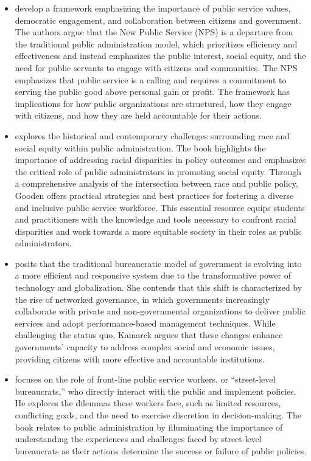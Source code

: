 \documentclass[12pt, letterpaper]{article}
\begin{document}
\begin{itemize}
    \item \cite{Denhardt2015} develop a framework emphasizing the importance of public service values, democratic engagement, and collaboration between citizens and government. The authors argue that the New Public Service (NPS) is a departure from the traditional public administration model, which prioritizes efficiency and effectiveness and instead emphasizes the public interest, social equity, and the need for public servants to engage with citizens and communities. The NPS emphasizes that public service is a calling and requires a commitment to serving the public good above personal gain or profit. The framework has implications for how public organizations are structured, how they engage with citizens, and how they are held accountable for their actions.
    \item \cite{Gooden2014} explores the historical and contemporary challenges surrounding race and social equity within public administration. The book highlights the importance of addressing racial disparities in policy outcomes and emphasizes the critical role of public administrators in promoting social equity. Through a comprehensive analysis of the intersection between race and public policy, Gooden offers practical strategies and best practices for fostering a diverse and inclusive public service workforce. This essential resource equips students and practitioners with the knowledge and tools necessary to confront racial disparities and work towards a more equitable society in their roles as public administrators.
    \item \cite{Kamarck2007} posits that the traditional bureaucratic model of government is evolving into a more efficient and responsive system due to the transformative power of technology and globalization. She contends that this shift is characterized by the rise of networked governance, in which governments increasingly collaborate with private and non-governmental organizations to deliver public services and adopt performance-based management techniques. While challenging the status quo, Kamarck argues that these changes enhance governments’ capacity to address complex social and economic issues, providing citizens with more effective and accountable institutions.
    \item \cite{Lipsky2010} focuses on the role of front-line public service workers, or ``street-level bureaucrats,'' who directly interact with the public and implement policies. He explores the dilemmas these workers face, such as limited resources, conflicting goals, and the need to exercise discretion in decision-making. The book relates to public administration by illuminating the importance of understanding the experiences and challenges faced by street-level bureaucrats as their actions determine the success or failure of public policies.
\end{itemize}
\end{document}

